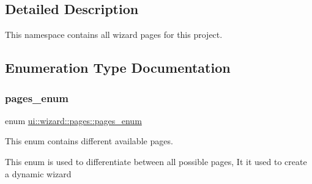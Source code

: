 \subsection{Detailed Description}
This namespace contains all wizard pages for this project. 

\subsection{Enumeration Type Documentation}
\mbox{\label{namespaceui_1_1wizard_1_1pages_a1a25c157e498474f0cf868944a52bf44}} 
\subsubsection{\texorpdfstring{pages\+\_\+enum}{pages\_enum}}
{\footnotesize\ttfamily enum \mbox{\hyperlink{namespaceui_1_1wizard_1_1pages_a1a25c157e498474f0cf868944a52bf44}{ui\+::wizard\+::pages\+::pages\+\_\+enum}}}



This enum contains different available pages. 

This enum is used to differentiate between all possible pages, It it used to create a dynamic wizard 